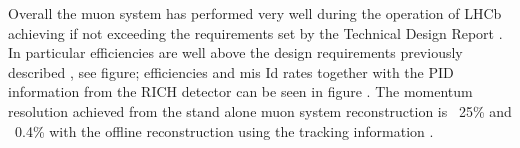 Overall the muon system has performed very well during the operation of LHCb achieving if not exceeding the requirements set by the Technical Design Report \cite{muon-tdr}. In particular efficiencies are well above the design requirements previously described \cite{Alves:2012ey}, see figure; efficiencies and mis Id rates together with the PID information from the RICH detector can be seen in figure \cite{Archilli:2013npa}. The momentum resolution achieved from the stand alone muon system reconstruction is ~25\% and ~0.4\% with the offline reconstruction using the tracking information \cite{Alves:2012ey}.






















